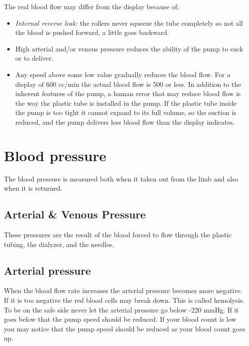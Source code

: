 \documentclass[
  11pt,
  letterpaper,
  DIV=11,
  numbers=noendperiod]{scrreprt}
\providecommand{\tightlist}{%
  \setlength{\itemsep}{0pt}\setlength{\parskip}{0pt}}\usepackage{longtable,booktabs,array}
\begin{document}
The real blood flow may differ from the display because of:

\begin{itemize}
\tightlist
\item
  \emph{Internal reverse leak:} the rollers never squeeze the tube
  completely so not all the blood is pushed forward, a little goes
  backward.
\item
  High arterial and/or venous pressure reduces the ability of the pump
  to suck or to deliver.
\item
  Any speed above some low value gradually reduces the blood flow. For a
  display of 600 cc/min the actual blood flow is 500 or less. In
  addition to the inherent features of the pump, a human error that may
  reduce blood flow is the way the plastic tube is installed in the
  pump. If the plastic tube inside the pump is too tight it cannot
  expand to its full volume, so the suction is reduced, and the pump
  delivers less blood flow than the display indicates.
\end{itemize}

\section{Blood pressure}\label{blood-pressure}

The blood pressure is measured both when it taken out from the limb and
also when it is returned.

\subsection{Arterial \& Venous Pressure}\label{arterial-venous-pressure}

These pressures are the result of the blood forced to flow through the
plastic tubing, the dialyzer, and the needles.

\subsection{Arterial pressure}\label{arterial-pressure}

When the blood flow rate increases the arterial pressure becomes more
negative. If it is too negative the red blood cells may break down. This
is called hemolysis. To be on the safe side never let the arterial
pressure go below -220 mmHg. If it goes below that the pump speed should
be reduced. If your blood count is low you may notice that the pump
speed should be reduced as your blood count goes up.
\end{document}
